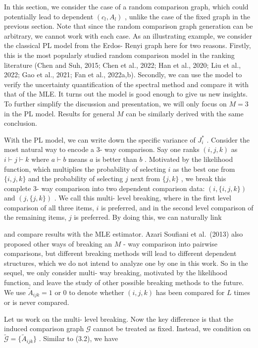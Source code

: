 In this section, we consider the case of a random comparison graph,
which could potentially lead to dependent \((c_l,A_l)\) , unlike the
case of the fixed graph in the previous section. Note that since the
random comparison graph generation can be arbitrary, we cannot work with
each case. As an illustrating example, we consider the classical PL
model from the Erdos- Renyi graph here for two reasons. Firstly, this is
the most popularly studied random comparison model in the ranking
literature (Chen and Suh, 2015; Chen et al., 2022; Han et al., 2020; Liu
et al., 2022; Gao et al., 2021; Fan et al., 2022a,b). Secondly, we can
use the model to verify the uncertainty quantification of the spectral
method and compare it with that of the MLE. It turns out the model is
good enough to give us new insights. To further simplify the discussion
and presentation, we will only focus on \(M = 3\) in the PL model.
Results for general \(M\) can be similarly derived with the same
conclusion.

With the PL model, we can write down the specific variance of
\(J_{i}^{*}\) . Consider the most natural way to encode a 3- way
comparison. Say one ranks \((i,j,k)\) as \(i\vdash j\vdash k\) where
\(a\vdash b\) means \(a\) is better than \(b\) . Motivated by the
likelihood function, which multiplies the probability of selecting \(i\)
as the best one from \(\{i,j,k\}\) and the probability of selecting
\(j\) next from \(\{j,k\}\) , we break this complete 3- way comparison
into two dependent comparison data: \((i,\{i,j,k\})\) and
\((j,\{j,k\})\) . We call this multi- level breaking, where in the first
level comparison of all three items, \(i\) is preferred, and in the
second level comparison of the remaining items, \(j\) is preferred. By
doing this, we can naturally link

and compare results with the MLE estimator. Azari Soufiani et al.~(2013)
also proposed other ways of breaking an \(M\) - way comparison into
pairwise comparisons, but different breaking methods will lead to
different dependent structures, which we do not intend to analyze one by
one in this work. So in the sequel, we only consider multi- way
breaking, motivated by the likelihood function, and leave the study of
other possible breaking methods to the future. We use
\(\widetilde{A}_{ijk} = 1\) or \(0\) to denote whether \((i,j,k)\) has
been compared for \(L\) times or is never compared.

Let us work on the multi- level breaking. Now the key difference is that
the induced comparison graph \(\mathcal{G}\) cannot be treated as fixed.
Instead, we condition on
\(\widetilde{\mathcal{G}} = \{\widetilde{A}_{ijk}\}\) . Similar to
(3.2), we have

